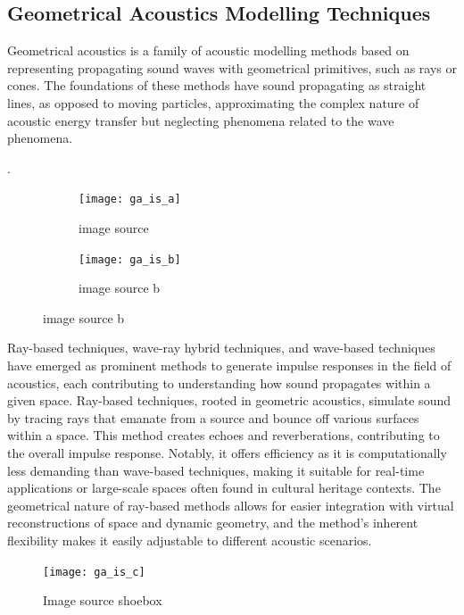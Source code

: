 \subsection{Geometrical Acoustics Modelling Techniques}\label{sec:bg-raytracing}
Geometrical acoustics is a family of acoustic modelling methods based on representing propagating sound waves with geometrical primitives, such as rays or cones. The foundations of these methods have sound propagating as straight lines, as opposed to moving particles, approximating the complex nature of acoustic energy transfer but neglecting phenomena related to the wave phenomena.

\citep{savioja2015overview}.

\begin{figure}
    \begin{subfigure}[t]{\linewidth}
        \centering
        \texttt{[image: ga\_is\_a]}
        \caption[Image Source]{image source}
    \end{subfigure}

    \begin{subfigure}[b]{\linewidth}
        \centering
        \texttt{[image: ga\_is\_b]}
        \caption[Image Source b]{image source b}
    \end{subfigure}
\end{figure}


Ray-based techniques, wave-ray hybrid techniques, and wave-based techniques have emerged as prominent methods to generate impulse responses in the field of acoustics, each contributing to understanding how sound propagates within a given space. Ray-based techniques, rooted in geometric acoustics, simulate sound by tracing rays that emanate from a source and bounce off various surfaces within a space. This method creates echoes and reverberations, contributing to the overall impulse response. Notably, it offers efficiency as it is computationally less demanding than wave-based techniques, making it suitable for real-time applications or large-scale spaces often found in cultural heritage contexts. The geometrical nature of ray-based methods allows for easier integration with virtual reconstructions of space and dynamic geometry, and the method's inherent flexibility makes it easily adjustable to different acoustic scenarios. \cite{vorlander2008simulation}
\begin{figure}
    \centering
    \texttt{[image: ga\_is\_c]}
    \caption[Image source shoebox]{Image source shoebox}
    \label{fig:ga_shoebox}
\end{figure}

